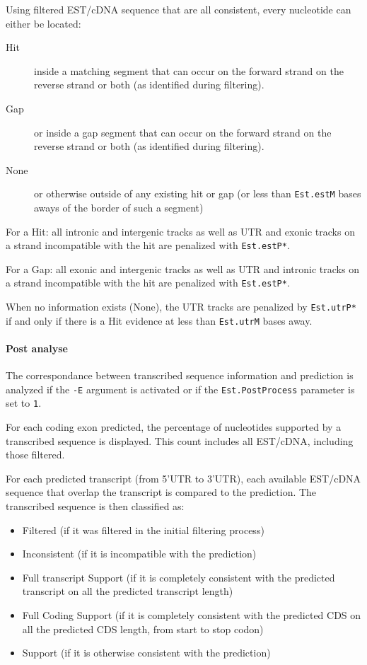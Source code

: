 Using filtered EST/cDNA sequence that are all consistent, every
nucleotide can either be located:
\begin{description}
\item[Hit] inside a matching segment that can occur on the forward strand
  on the reverse strand or both (as identified during filtering).
\item[Gap] or inside a gap segment that can occur on the forward strand
  on the reverse strand or both (as identified during filtering).
\item[None] or otherwise outside of any existing hit or gap (or less
  than \texttt{Est.estM} bases aways of the border of such a segment)
\end{description}

For a Hit: all intronic and intergenic tracks as well as UTR and
exonic tracks on a strand incompatible with the hit are penalized with
\texttt{Est.estP*}.

For a Gap: all exonic and intergenic tracks as well as UTR and
intronic tracks on a strand incompatible with the hit are penalized with
\texttt{Est.estP*}.

When no information exists (None), the UTR tracks are penalized by
\texttt{Est.utrP*} if and only if there is a Hit evidence at less than
\texttt{Est.utrM} bases away.

\paragraph{Post analyse}

The correspondance between transcribed sequence information and
prediction is analyzed if the \texttt{-E} argument
 is activated or if
the \texttt{Est.PostProcess} parameter is set to \texttt{1}.

For each coding exon predicted, the percentage of nucleotides
supported by a transcribed sequence is displayed. This count includes
all EST/cDNA, including those filtered.

For each predicted transcript (from 5'UTR to 3'UTR), each available
EST/cDNA sequence that overlap the transcript is compared to the
prediction. The transcribed sequence is then  classified as:
\begin{itemize}
\item Filtered (if it was filtered in the initial filtering process)
\item Inconsistent (if it is incompatible with the prediction)
\item Full transcript Support (if it is completely consistent with the
  predicted transcript on all the predicted transcript length)
\item Full Coding Support (if it is completely consistent with the
  predicted CDS on all the predicted CDS length, from start to stop
  codon)
\item Support (if it is otherwise consistent with the prediction)
\end{itemize}

